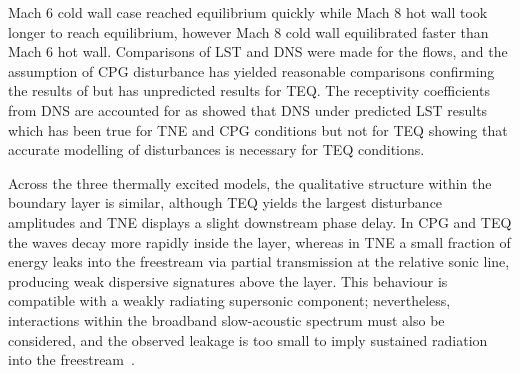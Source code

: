 Mach 6 cold wall case reached equilibrium quickly while Mach 8 hot wall took longer to reach equilibrium, however Mach 8 cold wall equilibrated faster than Mach 6 hot wall. Comparisons of \gls{LST} and \gls{DNS} were made for the flows, and the assumption of \gls{CPG} disturbance has yielded reasonable comparisons confirming the results of \cite{Wartemann2019} but has unpredicted results for \gls{TEQ}. The receptivity coefficients from \gls{DNS} are accounted for as \citep{Zhong2012} showed that DNS under predicted \gls{LST} results which has been true for \gls{TNE} and \gls{CPG} conditions but not for \gls{TEQ} showing that accurate modelling of disturbances is necessary for \gls{TEQ} conditions. 

Across the three thermally excited models, the qualitative structure within the boundary layer is similar, although \gls{TEQ} yields the largest disturbance amplitudes and \gls{TNE} displays a slight downstream phase delay. In \gls{CPG} and \gls{TEQ} the waves decay more rapidly inside the layer, whereas in \gls{TNE} a small fraction of energy leaks into the freestream via partial transmission at the relative sonic line, producing weak dispersive signatures above the layer. This behaviour is compatible with a weakly radiating supersonic component; nevertheless, interactions within the broadband slow-acoustic spectrum must also be considered, and the observed leakage is too small to imply sustained radiation into the freestream~\citep{KniselyZhong2019}.




